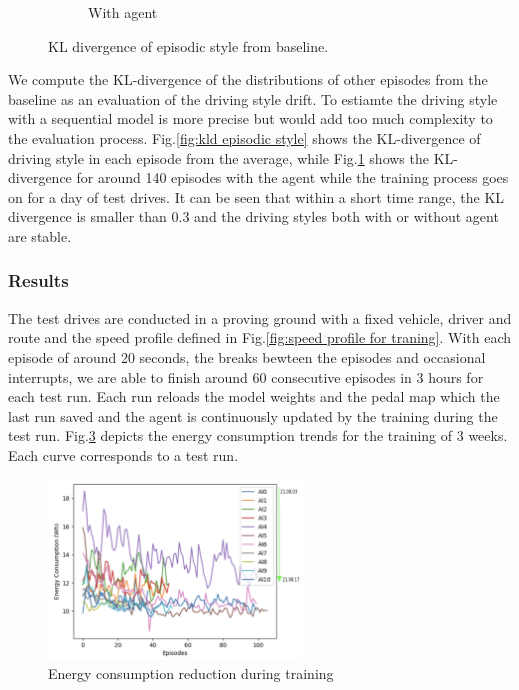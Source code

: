 \documentclass{article}
\begin{document}
\begin{figure}[htbp]
\begin{subfigure}[t]{0.45\textwidth}
		\caption{With agent}\label{fig:style deviation with agent}
	\end{subfigure}
	\caption{\label{fig:driving styles} KL divergence of episodic style from baseline.}
\end{figure}

We compute the KL-divergence of the distributions of other episodes from the baseline as an evaluation of the driving style drift. To estiamte the driving style with a sequential model is more precise but would add too much complexity to the evaluation process. Fig.\@\ref{fig:kld episodic style} shows the KL-divergence of driving style in each episode from the average, while Fig.\@\ref{fig:style deviation with agent} shows the KL-divergence for around 140 episodes with the agent while the training process goes on for a day of test drives. It can be seen that within a short time range, the KL divergence is smaller than 0.3 and the driving styles both with or without agent are stable.

\subsubsection{Results}\label{sec:results_small}

The test drives are conducted in a proving ground with a fixed vehicle, driver and route and the speed profile defined in Fig.\@\ref{fig:speed profile for traning}. With each episode of around 20 seconds, the breaks bewteen the episodes and occasional interrupts, we are able to finish around 60 consecutive episodes in 3 hours for each test run. Each run reloads the model weights and the pedal map which the last run saved and the agent is continuously updated by the training during the test run. Fig.\@\ref{fig:consumption reduction ddpg} depicts the energy consumption trends for the training of 3 weeks. Each curve corresponds to a test run.

\begin{figure}[ht]
	\centering
	\includegraphics[width=0.6\textwidth]{images/ddpg-training1.png}
	\caption{Energy consumption reduction during training}\label{fig:consumption reduction ddpg}
\end{figure}
\end{document}
